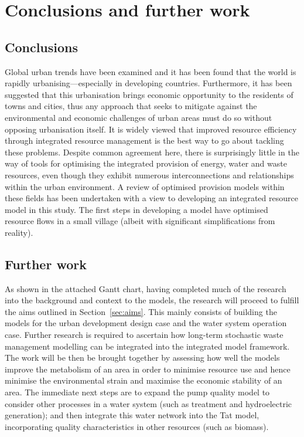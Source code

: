 \section{Conclusions and further work}
\label{sec:conc}

\subsection{Conclusions}
Global urban trends have been examined and it has been found that the world is rapidly urbanising---especially in developing countries. Furthermore, it has been suggested that this urbanisation brings economic opportunity to the residents of towns and cities, thus any approach that seeks to mitigate against the environmental and economic challenges of urban areas must do so without opposing urbanisation itself. It is widely viewed that improved resource efficiency through integrated resource management is the best way to go about tackling these problems. Despite common agreement here, there is surprisingly little in the way of tools for optimising the integrated provision of energy, water and waste resources, even though they exhibit numerous interconnections and relationships within the urban environment. A review of optimised provision models within these fields has been undertaken with a view to developing an integrated resource model in this study. The first steps in developing a model have optimised resource flows in a small village (albeit with significant simplifications from reality). 

\subsection{Further work}
As shown in the attached Gantt chart, having completed much of the research into the background and context to the models, the research will proceed to fulfill the aims outlined in Section~\ref{sec:aims}. This mainly consists of building the models for the urban development design case and the water system operation case. Further research is required to ascertain how long-term stochastic waste management modelling can be integrated into the integrated model framework. The work will be then be brought together by assessing how well the models improve the metabolism of an area in order to minimise resource use and hence minimise the environmental strain and maximise the economic stability of an area. The immediate next steps are to expand the pump quality model to consider other processes in a water system (such as treatment and hydroelectric generation); and then integrate this water network into the Tat model, incorporating quality characteristics in other resources (such as biomass).

